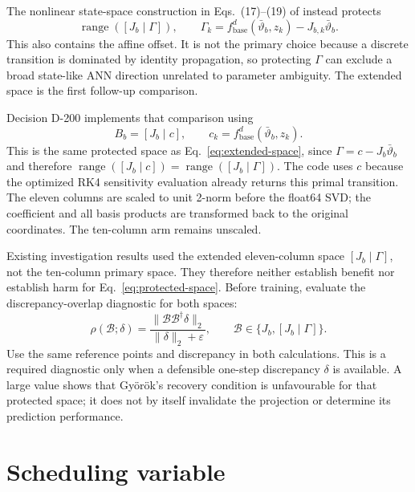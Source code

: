 \documentclass[11pt,a4paper]{article}
\begin{document}
The nonlinear state-space construction in Eqs.~(17)--(19) of
\cite{gyorok2025l4dc} instead protects
\begin{equation}
    \operatorname{range}([J_b\mid\Gamma]),
    \qquad
    \Gamma_k=f_{\mathrm{base}}^d(\bar\vartheta_b,z_k)
              -J_{b,k}\bar\vartheta_b.
    \label{eq:extended-space}
\end{equation}
This also contains the affine offset. It is not the primary choice because a
discrete transition is dominated by identity propagation, so protecting
\(\Gamma\) can exclude a broad state-like ANN direction unrelated to parameter
ambiguity. The extended space is the first follow-up comparison.

Decision D-200 implements that comparison using
\begin{equation}
    B_b=[J_b\mid c],\qquad
    c_k=f_{\mathrm{base}}^d(\bar\vartheta_b,z_k).
    \label{eq:implemented-affine-space}
\end{equation}
This is the same protected space as Eq.~\eqref{eq:extended-space}, since
\(\Gamma=c-J_b\bar\vartheta_b\) and therefore
\(\operatorname{range}([J_b\mid c])=
\operatorname{range}([J_b\mid\Gamma])\). The code uses \(c\) because the
optimized RK4 sensitivity evaluation already returns this primal transition.
The eleven columns are scaled to unit 2-norm before the float64 SVD; the
coefficient and all basis products are transformed back to the original
coordinates. The ten-column arm remains unscaled.

Existing investigation results used the extended eleven-column space
\([J_b\mid\Gamma]\), not the ten-column primary space. They therefore neither
establish benefit nor establish harm for Eq.~\eqref{eq:protected-space}.
Before training, evaluate the discrepancy-overlap diagnostic for both spaces:
\begin{equation}
    \rho(\mathcal B;\delta)
    =\frac{\|\mathcal B\mathcal B^\dagger\delta\|_2}
           {\|\delta\|_2+\varepsilon},
    \qquad
    \mathcal B\in\{J_b,[J_b\mid\Gamma]\}.
    \label{eq:discrepancy-overlap}
\end{equation}
Use the same reference points and discrepancy in both calculations. This is a
required diagnostic only when a defensible one-step discrepancy \(\delta\) is
available. A large value shows that Gy\"or\"ok's recovery condition is
unfavourable for that protected space; it does not by itself invalidate the
projection or determine its prediction performance.

\section{Scheduling variable}
\end{document}
